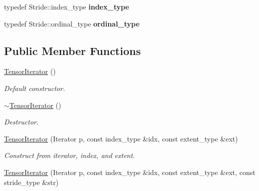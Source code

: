 \begin{DoxyCompactItemize}
\item 
\hypertarget{classbtas_1_1_tensor_iterator_a8202b4fce2c89fbfbc20edb4578565f2}{
typedef Stride::index\_\-type {\bfseries index\_\-type}}
\label{classbtas_1_1_tensor_iterator_a8202b4fce2c89fbfbc20edb4578565f2}

\item 
\hypertarget{classbtas_1_1_tensor_iterator_ab48635de952eac02da7fe6ddf2c52e38}{
typedef Stride::ordinal\_\-type {\bfseries ordinal\_\-type}}
\label{classbtas_1_1_tensor_iterator_ab48635de952eac02da7fe6ddf2c52e38}

\end{DoxyCompactItemize}
\subsection*{Public Member Functions}
\begin{DoxyCompactItemize}
\item 
\hypertarget{classbtas_1_1_tensor_iterator_a053e681888f18aa9983f4c032c479b2d}{
\hyperlink{classbtas_1_1_tensor_iterator_a053e681888f18aa9983f4c032c479b2d}{TensorIterator} ()}
\label{classbtas_1_1_tensor_iterator_a053e681888f18aa9983f4c032c479b2d}

\begin{DoxyCompactList}\small\item\em Default constructor. \item\end{DoxyCompactList}\item 
\hypertarget{classbtas_1_1_tensor_iterator_a189c4796edf62e71a6ac915498de0824}{
\hyperlink{classbtas_1_1_tensor_iterator_a189c4796edf62e71a6ac915498de0824}{$\sim$TensorIterator} ()}
\label{classbtas_1_1_tensor_iterator_a189c4796edf62e71a6ac915498de0824}

\begin{DoxyCompactList}\small\item\em Destructor. \item\end{DoxyCompactList}\item 
\hypertarget{classbtas_1_1_tensor_iterator_a9b6e9c3f62e74fe75623db53b38a4545}{
\hyperlink{classbtas_1_1_tensor_iterator_a9b6e9c3f62e74fe75623db53b38a4545}{TensorIterator} (Iterator p, const index\_\-type \&idx, const extent\_\-type \&ext)}
\label{classbtas_1_1_tensor_iterator_a9b6e9c3f62e74fe75623db53b38a4545}

\begin{DoxyCompactList}\small\item\em Construct from iterator, index, and extent. \item\end{DoxyCompactList}\item 
\hypertarget{classbtas_1_1_tensor_iterator_a439f826503c9f967db20e2f93d5b6aa6}{
\hyperlink{classbtas_1_1_tensor_iterator_a439f826503c9f967db20e2f93d5b6aa6}{TensorIterator} (Iterator p, const index\_\-type \&idx, const extent\_\-type \&ext, const stride\_\-type \&str)}
\label{classbtas_1_1_tensor_iterator_a439f826503c9f967db20e2f93d5b6aa6}


\end{DoxyCompactItemize}
